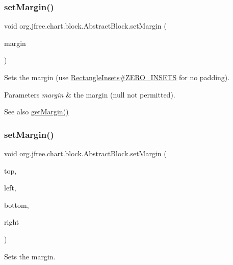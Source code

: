 \subsubsection{\texorpdfstring{set\+Margin()}{setMargin()}\hspace{0.1cm}{\footnotesize\ttfamily [1/2]}}
{\footnotesize\ttfamily void org.\+jfree.\+chart.\+block.\+Abstract\+Block.\+set\+Margin (\begin{DoxyParamCaption}\item[{Rectangle\+Insets}]{margin }\end{DoxyParamCaption})}

Sets the margin (use \mbox{\hyperlink{}{Rectangle\+Insets\#\+Z\+E\+R\+O\+\_\+\+I\+N\+S\+E\+TS}} for no padding).


\begin{DoxyParams}{Parameters}
{\em margin} & the margin ({\ttfamily null} not permitted).\\
\hline
\end{DoxyParams}
\begin{DoxySeeAlso}{See also}
\mbox{\hyperlink{classorg_1_1jfree_1_1chart_1_1block_1_1_abstract_block_a31c97bb88e5c0e55a444f8b93e9c0ca8}{get\+Margin()}} 
\end{DoxySeeAlso}
\mbox{\label{classorg_1_1jfree_1_1chart_1_1block_1_1_abstract_block_abe33f2d97cfea5605a8b1a8fd9b88c5d}} 
\subsubsection{\texorpdfstring{set\+Margin()}{setMargin()}\hspace{0.1cm}{\footnotesize\ttfamily [2/2]}}
{\footnotesize\ttfamily void org.\+jfree.\+chart.\+block.\+Abstract\+Block.\+set\+Margin (\begin{DoxyParamCaption}\item[{double}]{top,  }\item[{double}]{left,  }\item[{double}]{bottom,  }\item[{double}]{right }\end{DoxyParamCaption})}

Sets the margin.



